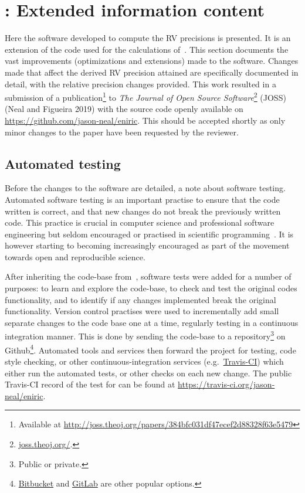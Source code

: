 
\section{\eniric{}: Extended \nir{} information content}
\label{sec:eniric}
Here the software developed to compute the {RV} precisions is presented.
It is an extension of the code used for the calculations of~\citet{figueira_radial_2016}.
This section documents the vast improvements (optimizations and extensions) made to the software.
Changes made that affect the derived {RV} precision attained are specifically documented in detail, with the relative precision changes provided.
This work resulted in a submission of a publication\footnote{Available at \href{http://joss.theoj.org/papers/384bfc031df47ecef2d88328f63e5479}{http://joss.theoj.org/papers/384bfc031df47ecef2d88328f63e5479}} to \emph{The Journal of Open Source Software}\footnote{\href{http://joss.theoj.org/}{joss.theoj.org/}.} (JOSS) (Neal and Figueira 2019) with the source code openly available on \href{Github}{https://github.com/jason-neal/eniric}.
This should be accepted shortly as only minor changes to the paper have been requested by the reviewer.


\subsection{Automated testing}
\label{subsec:automated_testing}
Before the changes to the software are detailed, a note about software testing.
Automated software testing is an important practise to ensure that the code written is correct, and that new changes do not break the previously written code.
This practice is crucial in computer science and professional software engineering but seldom encouraged or practised in scientific programming~\citep{storer_bridging_2017}.
It is however starting to becoming increasingly encouraged as part of the movement towards open and reproducible science.

After inheriting the code-base from~\citet{figueira_radial_2016}, software tests were added for a number of purposes: to learn and explore the code-base, to check and test the original codes functionality, and to identify if any changes implemented break the original functionality.
Version control practises were used to incrementally add small separate changes to the code base one at a time, regularly testing in a continuous integration manner.
This is done by sending the code-base to a repository\footnote{Public or private.} on Github\footnote{\href{https://bitbucket.org}{Bitbucket} and \href{https://gitlab.com}{GitLab} are other popular options.}.
Automated tools and services then forward the project for testing, code style checking, or other continuous-integration services (e.g.\ \href{https://travis-ci.com}{Travis-CI}) which either run the automated tests, or other checks on each new change.
The public Travis-CI record of the test for \eniric{} can be found at \href{https://travis-ci.org/jason-neal/eniric}{https://travis-ci.org/jason-neal/eniric}.

